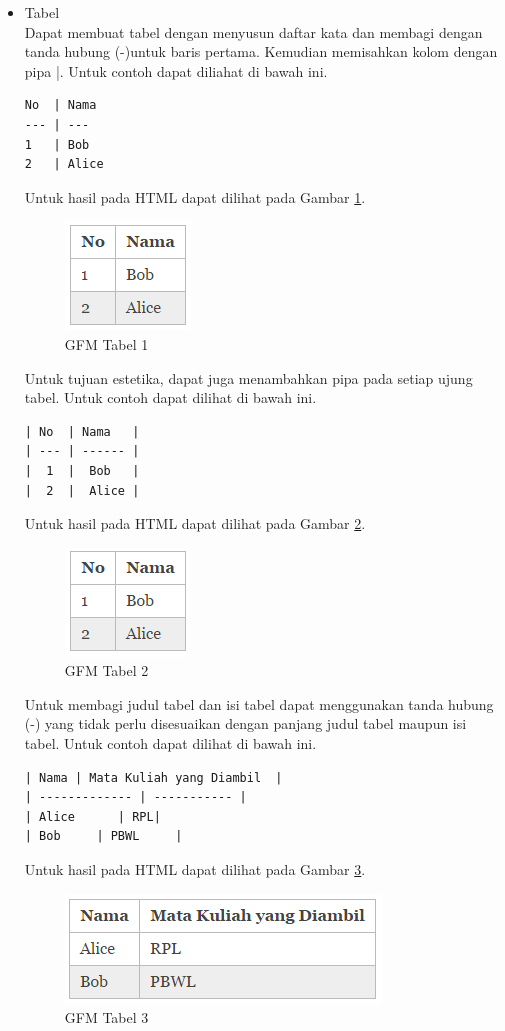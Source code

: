 \begin{itemize}
\item Tabel\\
Dapat membuat tabel dengan menyusun daftar kata dan membagi dengan tanda hubung (-)untuk baris pertama. Kemudian memisahkan kolom dengan pipa |. Untuk contoh dapat diliahat di bawah ini.
\begin{lstlisting}[basicstyle=\footnotesize]
No  | Nama
--- | ---
1   | Bob
2   | Alice
\end{lstlisting}
Untuk hasil pada HTML dapat dilihat pada Gambar \ref{fig:t1}.
\begin{figure}[H]
\centering
\includegraphics[scale=1]{Gambar/t1.png}
\caption[GFM Tabel 1]{GFM Tabel 1}
\label{fig:t1}
\end{figure}

Untuk tujuan estetika, dapat juga menambahkan pipa pada setiap ujung tabel. Untuk contoh dapat dilihat di bawah ini.
\begin{lstlisting}[basicstyle=\footnotesize]
| No  | Nama   |
| --- | ------ |
|  1  |  Bob   |
|  2  |  Alice |
\end{lstlisting}
Untuk hasil pada HTML dapat dilihat pada Gambar \ref{fig:t2}.
\begin{figure}[H]
\centering
\includegraphics[scale=1]{Gambar/t2.png}
\caption[GFM Tabel 2]{GFM Tabel 2}
\label{fig:t2}
\end{figure}

Untuk membagi judul tabel dan isi tabel dapat menggunakan tanda hubung (-) yang tidak perlu disesuaikan dengan panjang judul tabel maupun isi tabel. Untuk contoh dapat dilihat di bawah ini.
\begin{lstlisting}[basicstyle=\footnotesize]
| Nama | Mata Kuliah yang Diambil  |
| ------------- | ----------- |
| Alice      | RPL|
| Bob     | PBWL     |
\end{lstlisting}
Untuk hasil pada HTML dapat dilihat pada Gambar \ref{fig:t3}.
\begin{figure}[H]
\centering
\includegraphics[scale=1]{Gambar/t3.png}
\caption[GFM Tabel 3]{GFM Tabel 3}
\label{fig:t3}
\end{figure}


\end{itemize}
